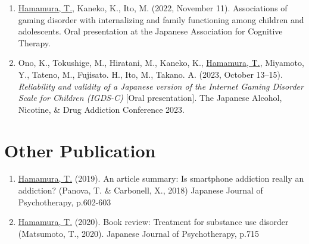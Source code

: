 \documentclass[a4paper]{article}
\begin{document}
\begin{enumerate}
	\item \underline{Hamamura, T.}, Kaneko, K., Ito, M. (2022, November 11). Associations of gaming disorder with internalizing and family functioning among children and adolescents. Oral presentation at the Japanese Association for Cognitive Therapy.
 	\item Ono, K., Tokushige, M., Hiratani, M., Kaneko, K., \underline{Hamamura, T.}, Miyamoto, Y., Tateno, M., Fujisato. H., Ito, M., Takano. A. (2023, October 13--15). \textit{Reliability and validity of a Japanese version of the Internet Gaming Disorder Scale for Children (IGDS-C)} [Oral presentation]. The Japanese Alcohol, Nicotine, \& Drug Addiction Conference 2023.
\end{enumerate}

\section{Other Publication}
	\begin{enumerate}
		\item \underline{Hamamura, T.} (2019). An article summary: Is smartphone addiction really an addiction? (Panova, T. \& Carbonell, X., 2018) Japanese Journal of Psychotherapy, p.602-603
		\item \underline{Hamamura, T.} (2020). Book review: Treatment for substance use disorder (Matsumoto, T., 2020). Japanese Journal of Psychotherapy, p.715
	\end{enumerate}
\end{document}
